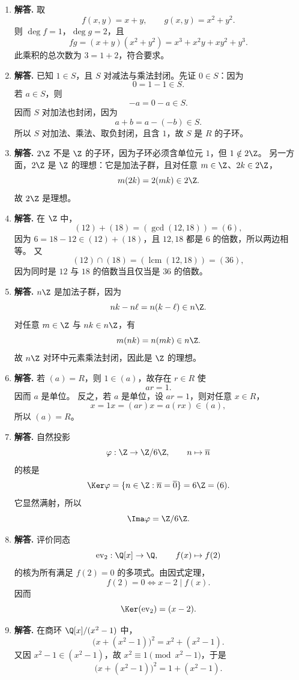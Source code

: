 \begin{enumerate}[label=\textbf{\arabic*.}, leftmargin=*, itemsep=1em]
  \item \textbf{解答.} 取
  \[
  f(x,y)=x+y,\qquad g(x,y)=x^2+y^2.
  \]
  则 $\deg f=1$，$\deg g=2$，且
  \[
  fg=(x+y)(x^2+y^2)=x^3+x^2y+xy^2+y^3.
  \]
  此乘积的总次数为 $3=1+2$，符合要求。

  \item \textbf{解答.} 已知 $1\in S$，且 $S$ 对减法与乘法封闭。先证 $0\in S$：因为
  \[
  0=1-1\in S.
  \]
  若 $a\in S$，则
  \[
  -a=0-a\in S.
  \]
  因而 $S$ 对加法也封闭，因为
  \[
  a+b=a-(-b)\in S.
  \]
  所以 $S$ 对加法、乘法、取负封闭，且含 $1$，故 $S$ 是 $R$ 的子环。

  \item \textbf{解答.} $2\Z$ 不是 $\Z$ 的子环，因为子环必须含单位元 $1$，但 $1\notin 2\Z$。  
  另一方面，$2\Z$ 是 $\Z$ 的理想：它是加法子群，且对任意 $m\in\Z$、$2k\in2\Z$，
  \[
  m(2k)=2(mk)\in 2\Z.
  \]
  故 $2\Z$ 是理想。

  \item \textbf{解答.} 在 $\Z$ 中，
  \[
  (12)+(18)=(\gcd(12,18))=(6),
  \]
  因为 $6=18-12\in (12)+(18)$，且 $12,18$ 都是 $6$ 的倍数，所以两边相等。  
  又
  \[
  (12)\cap(18)=(\operatorname{lcm}(12,18))=(36),
  \]
  因为同时是 $12$ 与 $18$ 的倍数当且仅当是 $36$ 的倍数。

  \item \textbf{解答.} $n\Z$ 是加法子群，因为
  \[
  nk-n\ell=n(k-\ell)\in n\Z.
  \]
  对任意 $m\in\Z$ 与 $nk\in n\Z$，有
  \[
  m(nk)=n(mk)\in n\Z.
  \]
  故 $n\Z$ 对环中元素乘法封闭，因此是 $\Z$ 的理想。

  \item \textbf{解答.} 若 $(a)=R$，则 $1\in(a)$，故存在 $r\in R$ 使
  \[
  ar=1.
  \]
  因而 $a$ 是单位。  
  反之，若 $a$ 是单位，设 $ar=1$，则对任意 $x\in R$，
  \[
  x=1x=(ar)x=a(rx)\in(a),
  \]
  所以 $(a)=R$。

  \item \textbf{解答.} 自然投影
  \[
  \varphi:\Z\to \Z/6\Z,\qquad n\mapsto \overline n
  \]
  的核是
  \[
  \Ker\varphi=\{n\in\Z: \overline n=\overline0\}=6\Z=(6).
  \]
  它显然满射，所以
  \[
  \Ima\varphi=\Z/6\Z.
  \]

  \item \textbf{解答.} 评价同态
  \[
  \operatorname{ev}_2:\Q[x]\to\Q,\qquad f(x)\mapsto f(2)
  \]
  的核为所有满足 $f(2)=0$ 的多项式。由因式定理，
  \[
  f(2)=0 \Longleftrightarrow x-2\mid f(x).
  \]
  因而
  \[
  \Ker(\operatorname{ev}_2)=(x-2).
  \]

  \item \textbf{解答.} 在商环 $\Q[x]/(x^2-1)$ 中，
  \[
  \bigl(x+(x^2-1)\bigr)^2=x^2+(x^2-1).
  \]
  又因 $x^2-1\in(x^2-1)$，故 $x^2\equiv 1\pmod{x^2-1}$，于是
  \[
  \bigl(x+(x^2-1)\bigr)^2=1+(x^2-1).
  \]


\end{enumerate}
